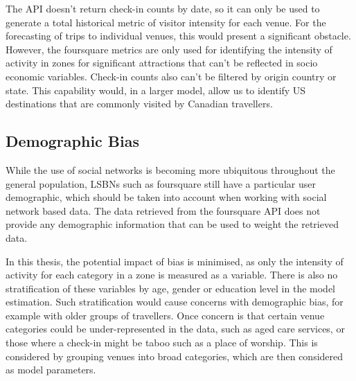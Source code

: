 The API doesn't return check-in counts by date, so it can only be used to generate a total historical metric of visitor intensity for each venue. For the forecasting of trips to individual venues, this would present a significant obstacle. However, the foursquare metrics are only used for identifying the intensity of activity in zones for significant attractions that can't be reflected in socio economic variables. Check-in counts also can't be filtered by origin country or state. This capability would, in a larger model, allow us to identify US destinations that are commonly visited by Canadian travellers.

\subsection{Demographic Bias}
While the use of social networks is becoming more ubiquitous throughout the general population, LSBNs such as foursquare still have a particular user demographic, which should be taken into account when working with social network based data. The data retrieved from the foursquare API does not provide any demographic information that can be used to weight the retrieved data.

In this thesis, the potential impact of bias is minimised, as only the intensity of activity for each category in a zone is measured as a variable. There is also no stratification of these variables by age, gender or education level in the model estimation. Such stratification would cause concerns with demographic bias, for example with older groups of travellers. Once concern is that certain venue categories could be under-represented in the data, such as aged care services, or those where a check-in might be taboo such as a place of worship. This is considered by grouping venues into broad categories, which are then considered as model parameters.
	
